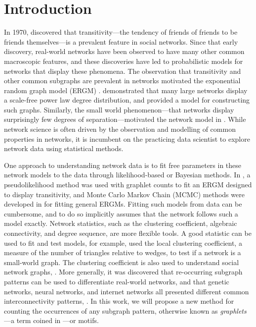 
	\section{Introduction}
	\label{sec:intro}
	
    In 1970, \cite{davis1970clustering} discovered that transitivity---the tendency of friends of friends to be friends themselves---is a prevalent feature in social networks.
    Since that early discovery, real-world networks have been observed to have many other common macroscopic features, and these discoveries have led to probabilistic models for networks that display these phenomena.
    The observation that transitivity and other common subgraphs are prevalent in networks motivated the exponential random graph model (ERGM) \cite{frank1986markov}.
    \cite{barabasi1999emergence} demonstrated that many large networks display a scale-free power law degree distribution, and provided a model for constructing such graphs.
    Similarly, the small world phenomenon---that networks display surprisingly few degrees of separation---motivated the network model in \cite{watts1998collective}.
    While network science is often driven by the observation and modelling of common properties in networks, it is incumbent on the practicing data scientist to explore network data using statistical methods. 
    
    One approach to understanding network data is to fit free parameters in these network models to the data through likelihood-based or Bayesian methods. 
    In \cite{wasserman1996logit}, a pseudolikelihood method was used with graphlet counts to fit an ERGM designed to display transitivity, and Monte Carlo Markov Chain (MCMC) methods were developed in \cite{snijders2002markov} for fitting general ERGMs.
	Fitting such models from data can be cumbersome, and to do so implicitly assumes that the network follows such a model exactly.
	Network statistics, such as the clustering coefficient, algebraic connectivity, and degree sequence, are more flexible tools.
	A good statistic can be used to fit and test models, for example, \cite{watts1998collective} used the local clustering coefficient, a measure of the number of triangles relative to wedges, to test if a network is a small-world graph.
	The clustering coefficient is also used to understand social network graphs, \cite{chakrabarti2006graph}.
	More generally, it was discovered that re-occurring subgraph patterns can be used to differentiate real-world networks, and that genetic networks, neural networks, and internet networks all presented different common interconnectivity patterns, \cite{milo2002network}.
	In this work, we will propose a new method for counting the occurrences of any subgraph pattern, otherwise known as {\em graphlets}---a term coined in \cite{prvzulj2004modeling}---or motifs.
	
